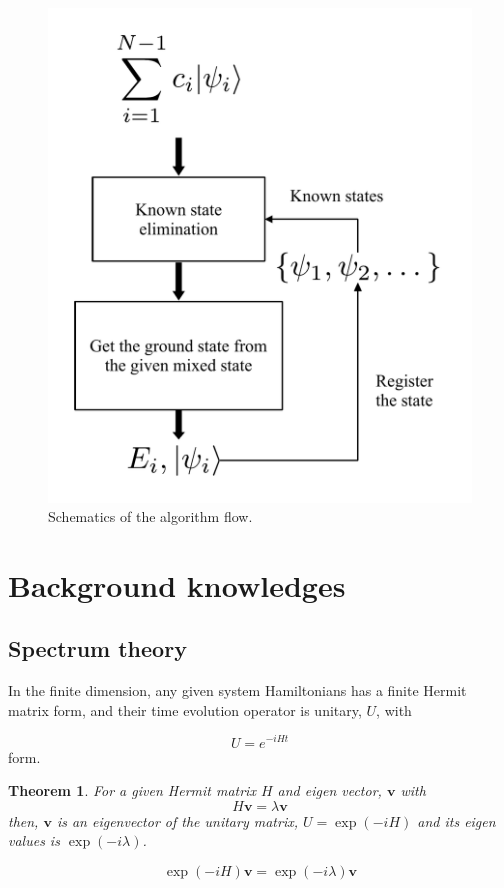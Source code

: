 \documentclass[twocolumn]{article}
\newtheorem{theorem}{Theorem}
\begin{document}
\begin{figure}[!ht]
    \centering
    \includegraphics[width=\linewidth]{Algorithm_diagram.pdf}
    \caption{Schematics of the algorithm flow.}
    \label{fig:alg_flow}
\end{figure}

\section{Background knowledges}

\subsection{Spectrum theory}

In the finite dimension, any given system Hamiltonians has a finite Hermit matrix form,
and their time evolution operator is unitary, $U$, with 

\begin{equation}
    U = e^{-i H t}
\end{equation}
form.

\begin{theorem}
    For a given Hermit matrix $H$ and eigen vector, $\mathbf{v}$ with
    \begin{equation}
        H \mathbf{v} = \lambda \mathbf{v}
    \end{equation}
    then, $\mathbf{v}$ is an eigenvector of the unitary matrix, $U = \exp(-i H)$ and 
    its eigen values is $\exp(-i \lambda)$.

    \begin{equation}
        \exp(-i H) \mathbf{v} = \exp(-i \lambda) \mathbf{v}
    \end{equation}
\end{theorem}
\end{document}
